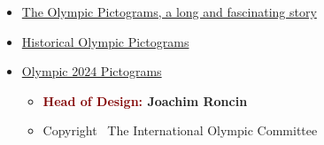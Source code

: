 \documentclass{ammTalk}
\begin{document}
\begin{itemize}[itemsep=6mm]\LARGE
\item \href{https://olympics.com/ioc/news/the-olympic-pictograms-a-long-and-fascinating-story}{The Olympic Pictograms, a long and fascinating story}

\item   \href{https://www.theolympicdesign.com/olympic-games/pictograms/}{Historical Olympic Pictograms}

\item   \href{https://olympics.com/en/paris-2024/the-games/the-brand/pictograms}{Olympic 2024 Pictograms}
\begin{itemize}\large
\item \textbf{\textcolor{Maroon}{Head of Design:} Joachim Roncin}
\item Copyright \textcopyright\ The International Olympic Committee
\end{itemize}

\end{itemize}
\end{document}
